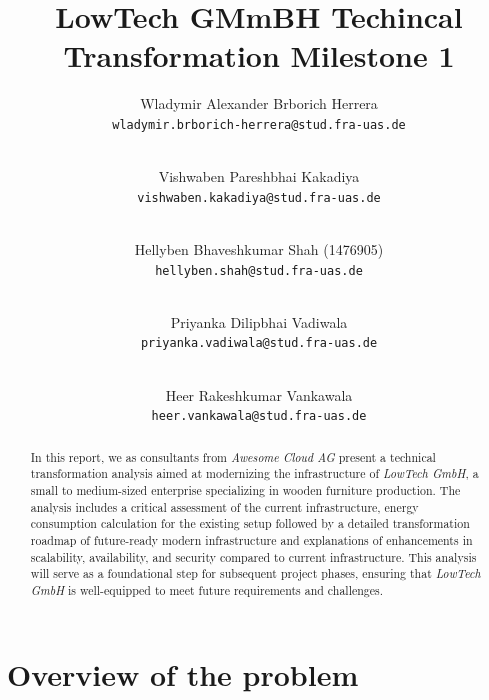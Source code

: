 \documentclass{llncs}
\newcommand{\what}{LowTech GMmBH Techincal Transformation Milestone 1}
\begin{document}
%
%
%
\mainmatter              %
%
\title{\what}
%
\author{
  Wladymir Alexander Brborich Herrera\\
  \texttt{wladymir.brborich-herrera@stud.fra-uas.de}
  \and\\ 
  Vishwaben Pareshbhai Kakadiya\\
  \texttt{vishwaben.kakadiya@stud.fra-uas.de}
  \and\\
  Hellyben Bhaveshkumar Shah (1476905)\\
  \texttt{hellyben.shah@stud.fra-uas.de}
  \and\\
  Priyanka Dilipbhai Vadiwala\\
  \texttt{priyanka.vadiwala@stud.fra-uas.de}
  \and\\
  Heer Rakeshkumar Vankawala\\
  \texttt{heer.vankawala@stud.fra-uas.de}
}
%

\maketitle              %

\begin{abstract}
In this report, we as consultants from \textit{Awesome Cloud AG} present a technical transformation analysis aimed at modernizing the infrastructure of \textit{LowTech GmbH}, 
a small to medium-sized enterprise specializing in wooden furniture production. 
The analysis includes a critical assessment of the current infrastructure, energy consumption calculation for the existing setup 
followed by a detailed transformation roadmap of future-ready modern infrastructure and explanations of enhancements in scalability, availability, and security compared to current infrastructure. 
This analysis will serve as a foundational step for subsequent project phases, ensuring that \textit{LowTech GmbH} is well-equipped to meet future requirements and challenges.
\end{abstract}

\section{Overview of the problem}
\end{document}
